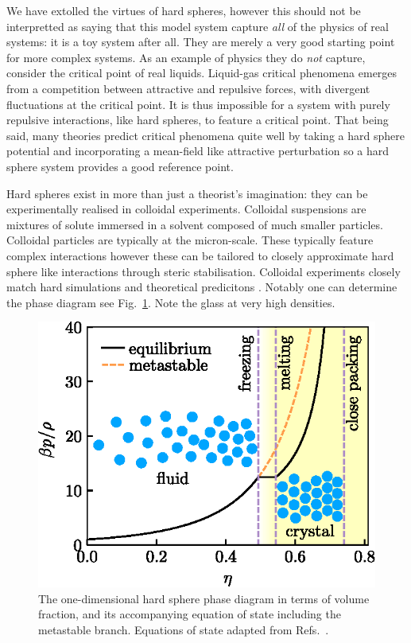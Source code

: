 \documentclass[11pt,twoside]{report}
\begin{document}
We have extolled the virtues of hard spheres, however this should not be interpretted as saying that this model system capture \emph{all} of the physics of real systems: it is a toy system after all.
They are merely a very good starting point for more complex systems.
As an example of physics they do \emph{not} capture, consider the critical point of real liquids.
Liquid-gas critical phenomena emerges from a competition between attractive and repulsive forces, with divergent fluctuations at the critical point.
It is thus impossible for a system with purely repulsive interactions, like hard spheres, to feature a critical point.
That being said, many theories predict critical phenomena quite well by taking a hard sphere potential and incorporating a mean-field like attractive perturbation \cite{?} so a hard sphere system provides a good reference point.

Hard spheres exist in more than just a theorist's imagination: they can be experimentally realised in colloidal experiments.
Colloidal suspensions are mixtures of solute immersed in a solvent composed of much smaller particles.
Colloidal particles are typically at the micron-scale.
These typically feature complex interactions \cite{Royall?,?,?} however these can be tailored to closely approximate hard sphere like interactions through steric stabilisation.
Colloidal experiments closely match hard simulations and theoretical predicitons \cite{?}.
Notably one can determine the phase diagram see Fig.\ \ref{fig:hs-phase-diagram}.
Note the glass at very high densities.

\begin{figure}
  \includegraphics[width=0.75\linewidth,outer]{hs-phase-diagram}
  \caption[The hard sphere phase diagram]{
    The one-dimensional hard sphere phase diagram in terms of volume fraction, and its accompanying equation of state including the metastable branch.
    Equations of state adapted from Refs.\ \cite{CarnahanJCP1969,SpeedyJPCM1998,BannermanJCP2010}.
  }
  \label{fig:hs-phase-diagram}
\end{figure}
\end{document}
